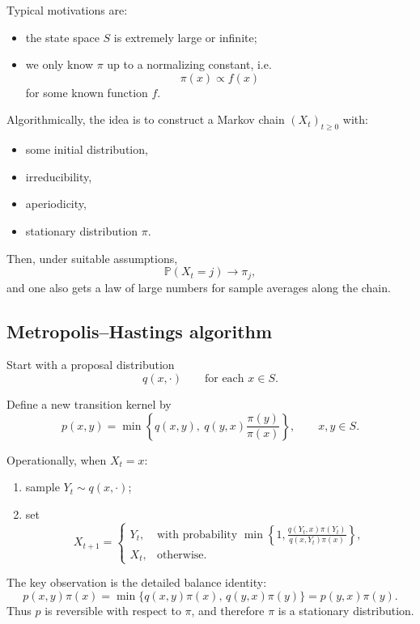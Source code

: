 \documentclass[11pt]{article}
\theoremstyle{definition}
\begin{document}
Typical motivations are:
\begin{itemize}[leftmargin=2em]
    \item the state space \(S\) is extremely large or infinite;
    \item we only know \(\pi\) up to a normalizing constant, i.e.
    \[
    \pi(x)\propto f(x)
    \]
    for some known function \(f\).
\end{itemize}

Algorithmically, the idea is to construct a Markov chain \((X_t)_{t\ge 0}\) with:
\begin{itemize}[leftmargin=2em]
    \item some initial distribution,
    \item irreducibility,
    \item aperiodicity,
    \item stationary distribution \(\pi\).
\end{itemize}

Then, under suitable assumptions,
\[
\mathbb P(X_t=j)\to \pi_j,
\]
and one also gets a law of large numbers for sample averages along the chain.

\subsection{Metropolis--Hastings algorithm}

Start with a proposal distribution
\[
q(x,\cdot)
\qquad \text{for each } x\in S.
\]

Define a new transition kernel by
\[
p(x,y)=\min\left\{q(x,y),\ q(y,x)\frac{\pi(y)}{\pi(x)}\right\},
\qquad x,y\in S.
\]

Operationally, when \(X_t=x\):
\begin{enumerate}[label=\arabic*.]
    \item sample \(Y_t\sim q(x,\cdot)\);
    \item set
    \[
    X_{t+1}=
    \begin{cases}
    Y_t, & \text{with probability }
    \min\left\{1,\frac{q(Y_t,x)\pi(Y_t)}{q(x,Y_t)\pi(x)}\right\},\\[0.8em]
    X_t, & \text{otherwise.}
    \end{cases}
    \]
\end{enumerate}

The key observation is the detailed balance identity:
\[
p(x,y)\pi(x)
=
\min\{q(x,y)\pi(x),\,q(y,x)\pi(y)\}
=
p(y,x)\pi(y).
\]
Thus \(p\) is reversible with respect to \(\pi\), and therefore \(\pi\) is a stationary distribution.
\end{document}

